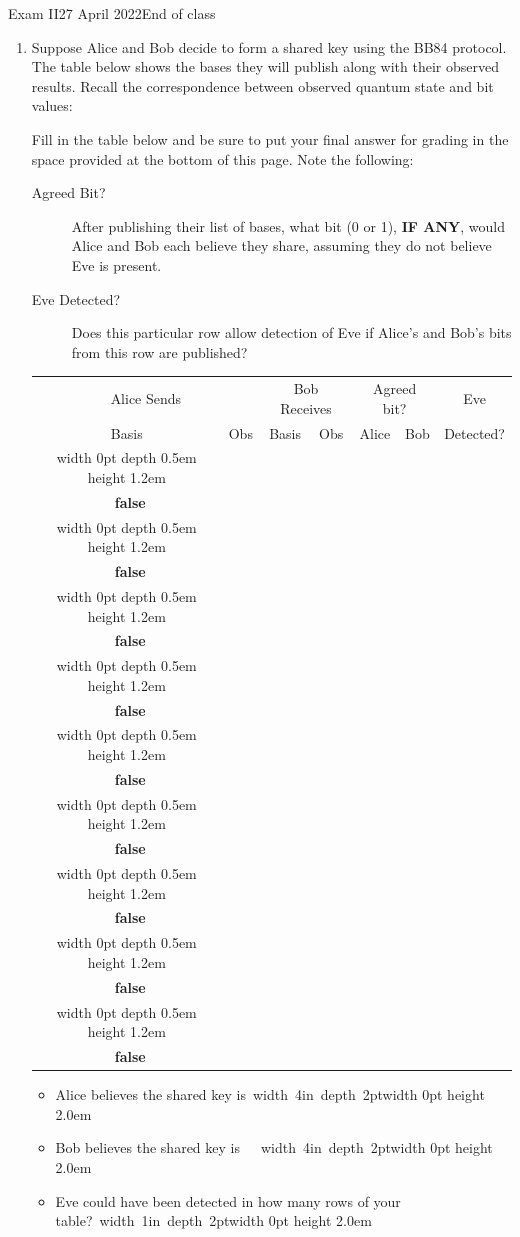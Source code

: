 \documentclass[12pt]{article}
\def\Obox#1{\Ovalbox{\hbox to 1ex{\vrule width 0pt height 1ex\hss #1\hss}}}
\def\TFMarked#1#2{\ \stackbox[l][m]{\Obox{#1}~\textbf{true}\\\Obox{#2}~\textbf{false}}}
\def\TF{\TFMarked{\relax}{\relax}}
\newcommand{\Blank}[1][1in]{\mbox{\vrule width #1 depth 2pt}\vrule width 0pt height 2.0em}
\begin{document}
\begin{assignment}{Exam II}{27 April 2022}{End of class}
\begin{enumerate}
\clearpage\item{}  Suppose Alice and Bob decide to form a shared key using the BB84 protocol.  The table below shows the bases they will publish along with their observed results.   Recall the correspondence between observed quantum state and bit values:
\begin{BBKey}
\begin{center}
\BBBasis{}
\end{center}
\end{BBKey}
\def\RowU#1#2#3#4{%
\vrule width 0pt depth 0.5em height 1.2em#1 &#2 & #3 & #4 & & & {\vrule width 0pt depth 13pt\small\TF{}}  \\ \hline}
\def\Row#1#2#3{%
\RowU{\STD}{#1}{#2}{#3}}
\def\RowX#1#2#3{%
\RowU{\HDM}{#1}{#2}{#3}}

Fill in the table below and be sure to put your final answer for grading in the space provided at the bottom of this page.  Note the following:
\begin{description}
  \item[Agreed Bit?]  After publishing their list of bases, what bit (0 or 1), \textbf{IF ANY}, would Alice and Bob each believe they share, assuming they do not believe Eve is present.
  \item[Eve Detected?] Does this particular row allow detection of Eve if Alice's and Bob's bits from this row are published?
\end{description}

\begin{BBKey}
\begin{center}\Large
\begin{tabular}{c|c||c|c||c|c||c}
\multicolumn{2}{c||}{Alice Sends} & \multicolumn{2}{c||}{Bob Receives}& \multicolumn{2}{c||}{Agreed bit?}&Eve \\
Basis & Obs & Basis & Obs & Alice & Bob & Detected?\\\hline
\Row{\BBRt}{\STD}{\BBRt}
\Row{\BBUp}{\STD}{\BBUp}
\Row{\BBRt}{\STD}{\BBRt}
\Row{\BBUp}{\HDM}{\BBNe}
\Row{\BBRt}{\HDM}{\BBSe}
\RowX{\BBNe}{\HDM}{\BBSe}
\RowX{\BBSe}{\HDM}{\BBSe}
\RowX{\BBNe}{\HDM}{\BBNe}
\RowX{\BBNe}{\HDM}{\BBNe}

\end{tabular}
\end{center}
\end{BBKey}
\begin{itemize}
    \item Alice believes the shared key is~\Blank[4in]{}
    \item Bob believes the shared key is\ \ ~\Blank[4in]{}
    \item Eve could have been detected in how many rows of your table?~\Blank{}
\end{itemize}


\end{enumerate}
\end{assignment}
\end{document}
